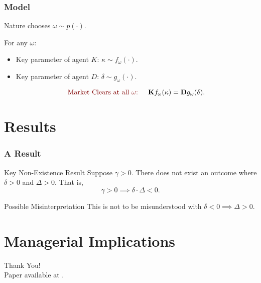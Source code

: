 \documentclass[10pt, mathserif, aspectratio = 169]{beamer}
\begin{document}
\begin{frame}
\frametitle{Model}

Nature chooses $\omega \sim p(\cdot)$.\pause\vspace{2em}

For any $\omega$:\pause\vspace{2em}

\begin{itemize}
\item Key parameter of agent $K$: $\kappa \sim  f_\omega(\cdot)$. \pause\vspace{2em}

\item Key parameter of agent $D$: $\delta \sim g_\omega(\cdot)$. \pause\vspace{2em}

\begin{equation*}
\text{\callout{Market Clears at all $\omega$:} } \quad \mathbf{K} f_\omega(\kappa) = \mathbf{D} g_\omega(\delta).
\end{equation*}
\end{itemize}


\end{frame}

\section{Results}

\begin{frame}
\frametitle{A Result}
\pause
\begin{block}{Key Non-Existence Result}
Suppose $\gamma > 0$. There does not exist an outcome where $\delta > 0$ and $\Delta > 0$. That is,
\begin{equation*}
\gamma > 0 \implies \delta \cdot \Delta < 0.
\end{equation*}
\end{block}
\pause
\begin{block}{Possible Misinterpretation}
This is not to be misunderstood with $\delta < 0 \implies \Delta > 0$.
\end{block}

\end{frame}

\section[Implications]{Managerial Implications}

\begin{frame}
\begin{center}
\textcolor{asumaroon}{\Large{Thank You!}}\\
Paper available at \texttt{}.
\end{center}



\end{frame}
\end{document}
